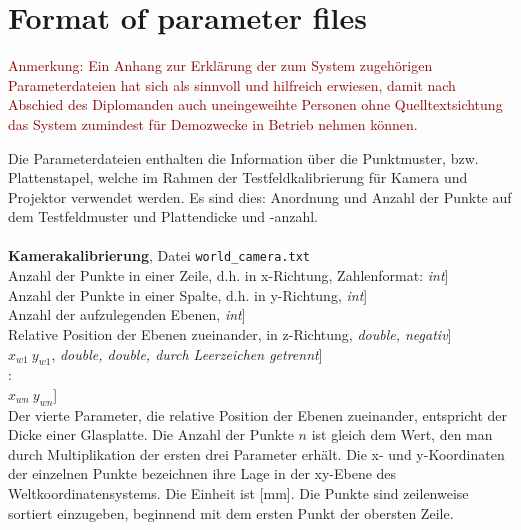 \chapter{Format of parameter files}
\label{anhang_b}

\textcolor{darkred}{Anmerkung: Ein Anhang zur Erklärung der zum System zugehörigen Parameterdateien hat sich als sinnvoll und hilfreich erwiesen, damit nach Abschied des Diplomanden auch uneingeweihte Personen ohne Quelltextsichtung das System zumindest für Demozwecke in Betrieb nehmen können.}

\medskip


Die Parameterdateien enthalten die Information über die Punktmuster, bzw. Plattenstapel, welche im Rahmen der Testfeldkalibrierung für Kamera und Projektor verwendet werden. Es sind dies: Anordnung und Anzahl der Punkte auf dem Testfeldmuster und Plattendicke und -anzahl.\\\\
\textbf{Kamerakalibrierung}, Datei \verb$world_camera.txt$\vspace{11pt}\\
\text{[}Anzahl der Punkte in einer Zeile, d.h. in x-Richtung, Zahlenformat: \emph{int}]\\
\text{[}Anzahl der Punkte in einer Spalte, d.h. in y-Richtung, \emph{int}]\\
\text{[}Anzahl der aufzulegenden Ebenen, \emph{int}]\\
\text{[}Relative Position der Ebenen zueinander, in z-Richtung, \emph{double, negativ}]\\
\text{[}$x_{w1}\ y_{w1}$, \emph{double, double, durch Leerzeichen getrennt}]\\
:\\
\text{[}$x_{wn}\ y_{wn}$]\\

Der vierte Parameter, die relative Position der Ebenen zueinander, entspricht der Dicke einer Glasplatte. Die Anzahl der Punkte $n$ ist gleich dem Wert, den man durch Multiplikation der ersten drei Parameter erhält. Die x- und y-Koordinaten der einzelnen Punkte bezeichnen ihre Lage in der xy-Ebene des Weltkoordinatensystems. Die Einheit ist [mm]. Die Punkte sind zeilenweise sortiert einzugeben, beginnend mit dem ersten Punkt der obersten Zeile.\\


